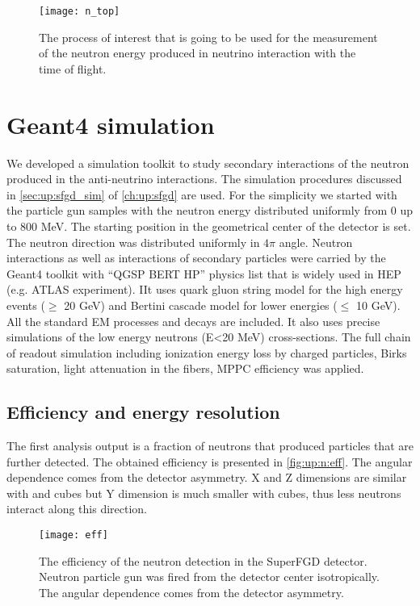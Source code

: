 \documentclass[main.tex]{subfiles}
\begin{document}
\begin{figure}[!ht]
	\centering
	\texttt{[image: n\_top]}
	\caption{The process of interest that is going to be used for the measurement of the neutron energy produced in neutrino interaction with the time of flight.}
	\label{fig:up:n:top}
\end{figure}

\section{Geant4 simulation}
We developed a simulation toolkit to study secondary interactions of the neutron produced in the anti-neutrino interactions. The simulation procedures discussed in \autoref{sec:up:sfgd_sim} of \autoref{ch:up:sfgd} are used. For the simplicity we started with the particle gun samples with the neutron energy distributed uniformly from 0 up to 800 MeV. The starting position in the geometrical center of the detector is set. The neutron direction was distributed uniformly in $4\pi$ angle. Neutron interactions as well as interactions of secondary particles were carried by the Geant4 toolkit with ``QGSP BERT HP'' physics list that is widely used in HEP (e.g. ATLAS experiment). IIt uses quark gluon string model for the high energy events ($\geqslant$ 20 GeV) and Bertini cascade model for lower energies ($\leqslant$ 10 GeV). All the standard EM processes and decays are included. It also uses precise simulations of the low energy neutrons (E<20 MeV) cross-sections. The full chain of readout simulation including ionization energy loss by charged particles, Birks saturation, light attenuation in the fibers, MPPC efficiency was applied.

\subsection{Efficiency and energy resolution}
The first analysis output is a fraction of neutrons that produced particles that are further detected. The obtained efficiency is presented in \autoref{fig:up:n:eff}. The angular dependence comes from the detector asymmetry. X and Z dimensions are similar with \sfgdx{} and \sfgdz{} cubes but Y dimension is much smaller with \sfgdy{} cubes, thus less neutrons interact along this direction.

\begin{figure}[!ht]
	\centering
	\texttt{[image: eff]}
	\caption{The efficiency of the neutron detection in the SuperFGD detector. Neutron particle gun was fired from the detector center isotropically. The angular dependence comes from the detector asymmetry.}
	\label{fig:up:n:eff}
\end{figure}
\end{document}
